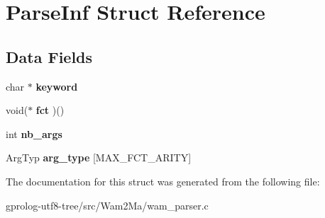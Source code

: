 \hypertarget{structParseInf}{}\section{Parse\+Inf Struct Reference}
\label{structParseInf}
\subsection*{Data Fields}
\begin{DoxyCompactItemize}
\item 
char $\ast$ {\bfseries keyword}\hypertarget{structParseInf_affadb424830268d2231588e867b1fb40}{}\label{structParseInf_affadb424830268d2231588e867b1fb40}

\item 
void($\ast$ {\bfseries fct} )()\hypertarget{structParseInf_a17e09c905211b8d0ac00827aeeea9237}{}\label{structParseInf_a17e09c905211b8d0ac00827aeeea9237}

\item 
int {\bfseries nb\+\_\+args}\hypertarget{structParseInf_abb84b55b8b29fe0bccf151d7400f0d9d}{}\label{structParseInf_abb84b55b8b29fe0bccf151d7400f0d9d}

\item 
Arg\+Typ {\bfseries arg\+\_\+type} \mbox{[}M\+A\+X\+\_\+\+F\+C\+T\+\_\+\+A\+R\+I\+TY\mbox{]}\hypertarget{structParseInf_a4bc1d3c3237113de20adb4050419bca6}{}\label{structParseInf_a4bc1d3c3237113de20adb4050419bca6}

\end{DoxyCompactItemize}


The documentation for this struct was generated from the following file\+:\begin{DoxyCompactItemize}
\item 
gprolog-\/utf8-\/tree/src/\+Wam2\+Ma/wam\+\_\+parser.\+c\end{DoxyCompactItemize}
